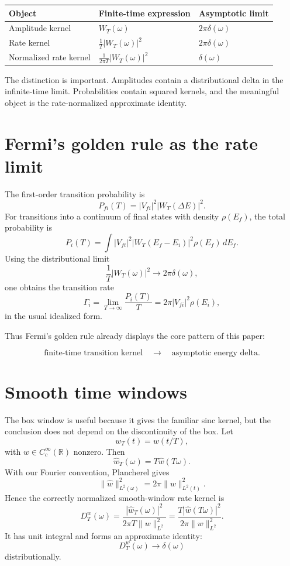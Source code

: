 \documentclass[11pt]{article}
\begin{document}
\begin{center}
\begin{tabular}{lll}
\hline
Object & Finite-time expression & Asymptotic limit \\
\hline
Amplitude kernel & \(W_T(\omega)\) & \(2\pi\delta(\omega)\) \\
Rate kernel & \(\frac{1}{T}|W_T(\omega)|^2\) & \(2\pi\delta(\omega)\) \\
Normalized rate kernel & \(\frac{1}{2\pi T}|W_T(\omega)|^2\) & \(\delta(\omega)\) \\
\hline
\end{tabular}
\end{center}

The distinction is important.  Amplitudes contain a distributional delta in the infinite-time limit.  Probabilities contain squared kernels, and the meaningful object is the rate-normalized approximate identity.

\section{Fermi's golden rule as the rate limit}

The first-order transition probability is
\[
P_{fi}(T)=|V_{fi}|^2 |W_T(\Delta E)|^2.
\]
For transitions into a continuum of final states with density \(\rho(E_f)\), the total probability is
\[
P_i(T)=\int |V_{fi}|^2 |W_T(E_f-E_i)|^2\rho(E_f)\,dE_f.
\]
Using the distributional limit
\[
\frac{1}{T}|W_T(\omega)|^2\to 2\pi\delta(\omega),
\]
one obtains the transition rate
\[
\Gamma_i
=
\lim_{T\to\infty}\frac{P_i(T)}{T}
=
2\pi |V_{fi}|^2\rho(E_i),
\]
in the usual idealized form.

Thus Fermi's golden rule already displays the core pattern of this paper:

\[
\boxed{\text{finite-time transition kernel}\quad\longrightarrow\quad\text{asymptotic energy delta}.}
\]

\section{Smooth time windows}

The box window is useful because it gives the familiar sinc kernel, but the conclusion does not depend on the discontinuity of the box.  Let
\[
w_T(t)=w(t/T),
\]
with \(w\in C_c^\infty(\mathbb R)\) nonzero.  Then
\[
\widehat w_T(\omega)=T\widehat w(T\omega).
\]
With our Fourier convention, Plancherel gives
\[
\|\widehat w\|_{L^2(\omega)}^2=2\pi\|w\|_{L^2(t)}^2.
\]
Hence the correctly normalized smooth-window rate kernel is
\[
D_T^w(\omega)
=
\frac{|\widehat w_T(\omega)|^2}{2\pi T\|w\|_{L^2}^2}
=
\frac{T|\widehat w(T\omega)|^2}{2\pi \|w\|_{L^2}^2}.
\]
It has unit integral and forms an approximate identity:
\[
D_T^w(\omega)\to \delta(\omega)
\]
distributionally.
\end{document}

